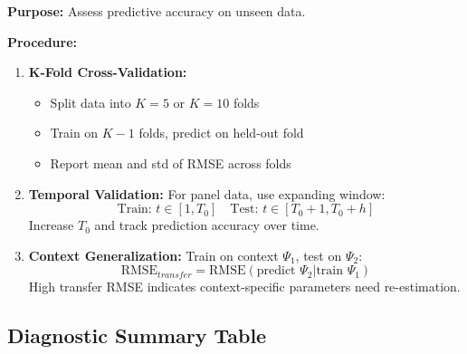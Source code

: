 \begin{tcolorbox}[colback=gray!5!white, colframe=gray!75!black,
    title=Diagnostic Protocol AZ-V4: Cross-Validation]
\textbf{Purpose:} Assess predictive accuracy on unseen data.

\textbf{Procedure:}
\begin{enumerate}[nosep]
\item \textbf{K-Fold Cross-Validation:}
\begin{itemize}[nosep]
\item Split data into $K = 5$ or $K = 10$ folds
\item Train on $K-1$ folds, predict on held-out fold
\item Report mean and std of RMSE across folds
\end{itemize}

\item \textbf{Temporal Validation:}
For panel data, use expanding window:
\begin{equation}
\text{Train: } t \in [1, T_0] \quad \text{Test: } t \in [T_0+1, T_0+h]
\end{equation}
Increase $T_0$ and track prediction accuracy over time.

\item \textbf{Context Generalization:}
Train on context $\Psi_1$, test on $\Psi_2$:
\begin{equation}
\text{RMSE}_{transfer} = \text{RMSE}(\text{predict } \Psi_2 | \text{train } \Psi_1)
\end{equation}
High transfer RMSE indicates context-specific parameters need re-estimation.
\end{enumerate}
\end{tcolorbox}

\subsection{Diagnostic Summary Table}

